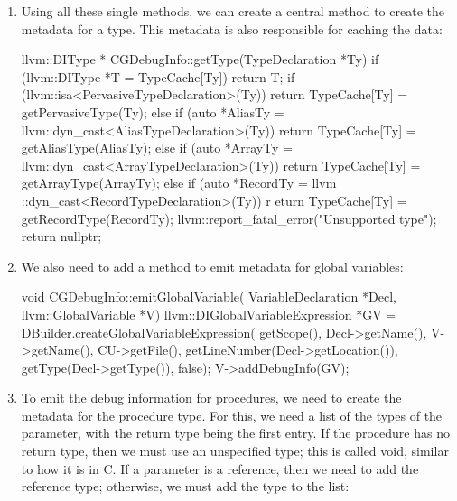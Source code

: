\begin{enumerate}
\item
Using all these single methods, we can create a central method to create the metadata for a type. This metadata is also responsible for caching the data:

\begin{cpp}
llvm::DIType *
CGDebugInfo::getType(TypeDeclaration *Ty) {
    if (llvm::DIType *T = TypeCache[Ty])
        return T;
    if (llvm::isa<PervasiveTypeDeclaration>(Ty))
        return TypeCache[Ty] = getPervasiveType(Ty);
    else if (auto *AliasTy =
        llvm::dyn_cast<AliasTypeDeclaration>(Ty))
            return TypeCache[Ty] = getAliasType(AliasTy);
    else if (auto *ArrayTy =
        llvm::dyn_cast<ArrayTypeDeclaration>(Ty))
            return TypeCache[Ty] = getArrayType(ArrayTy);
    else if (auto *RecordTy =
        llvm ::dyn_cast<RecordTypeDeclaration>(Ty))
        r   eturn TypeCache[Ty] = getRecordType(RecordTy);
    llvm::report_fatal_error("Unsupported type");
    return nullptr;
}
\end{cpp}

\item
We also need to add a method to emit metadata for global variables:

\begin{cpp}
void CGDebugInfo::emitGlobalVariable(
VariableDeclaration *Decl,
llvm::GlobalVariable *V) {
    llvm::DIGlobalVariableExpression *GV =
        DBuilder.createGlobalVariableExpression(
            getScope(), Decl->getName(), V->getName(),
            CU->getFile(),
            getLineNumber(Decl->getLocation()),
            getType(Decl->getType()), false);
    V->addDebugInfo(GV);
}
\end{cpp}

\item
To emit the debug information for procedures, we need to create the metadata for the procedure type. For this, we need a list of the types of the parameter, with the return type being the first entry. If the procedure has no return type, then we must use an unspecified type; this is called void, similar to how it is in C. If a parameter is a reference, then we need to add the reference type; otherwise, we must add the type to the list:


\end{enumerate}
